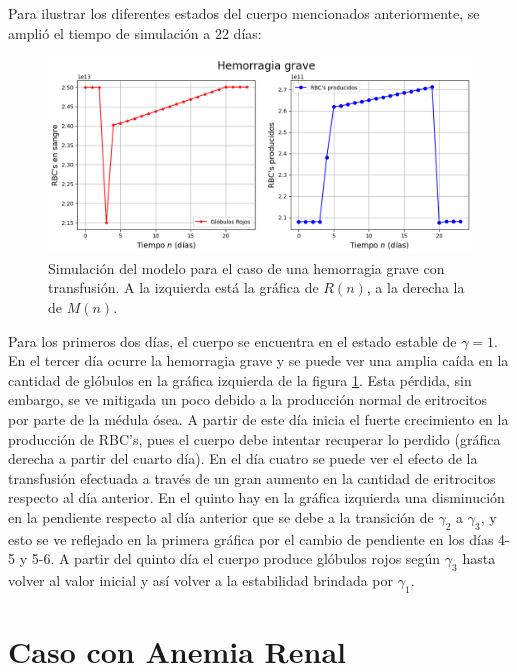 Para ilustrar los diferentes estados del cuerpo mencionados anteriormente, se amplió el tiempo de simulación a 22 días: 

\begin{figure}[H]
    \centering
    \captionsetup{justification=centering}
    \includegraphics[scale=0.534]{figures/HemoGrave.png}
    \caption{Simulación del modelo para el caso de una hemorragia grave con transfusión. A la izquierda está la gráfica de $R(n)$, a la derecha la de $M(n)$.}
    \label{sec:variaciones:fig:HemoGrave}
\end{figure}

Para los primeros dos días, el cuerpo se encuentra en el estado estable de $\gamma = 1$. En el tercer día ocurre la hemorragia grave y se puede ver una amplia caída en la cantidad de glóbulos en la gráfica izquierda de la figura \ref{sec:variaciones:fig:HemoGrave}. Esta pérdida, sin embargo, se ve mitigada un poco debido a la producción normal de eritrocitos por parte de la médula ósea. A partir de este día inicia el fuerte crecimiento en la producción de RBC's, pues el cuerpo debe intentar recuperar lo perdido (gráfica derecha a partir del cuarto día). En el día cuatro se puede ver el efecto de la transfusión efectuada a través de un gran aumento en la cantidad de eritrocitos respecto al día anterior. En el quinto hay en la gráfica izquierda una disminución en la pendiente respecto al día anterior que se debe a la transición de $\gamma_2$ a $\gamma_3$, y esto se ve reflejado en la primera gráfica por el cambio de pendiente en los días 4-5 y 5-6. A partir del quinto día el cuerpo produce glóbulos rojos según $\gamma_3$ hasta volver al valor inicial y así volver a la estabilidad brindada por $\gamma_1$.

\section{Caso con Anemia Renal}\label{Sec:variaciones:anemia}


